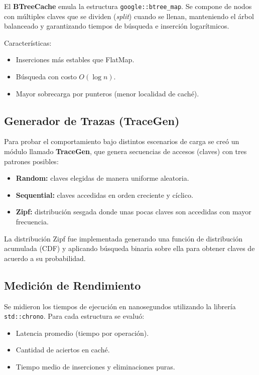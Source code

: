 \documentclass[12pt,a4paper]{article}
\begin{document}
El \textbf{BTreeCache} emula la estructura \texttt{google::btree\_map}.  
Se compone de nodos con múltiples claves que se dividen (\emph{split}) cuando se llenan,  
manteniendo el árbol balanceado y garantizando tiempos de búsqueda e inserción logarítmicos.  

Características:
\begin{itemize}
    \item Inserciones más estables que FlatMap.
    \item Búsqueda con costo \(O(\log n)\).
    \item Mayor sobrecarga por punteros (menor localidad de caché).
\end{itemize}

\subsection{Generador de Trazas (TraceGen)}

Para probar el comportamiento bajo distintos escenarios de carga se creó un módulo llamado \textbf{TraceGen},  
que genera secuencias de accesos (claves) con tres patrones posibles:

\begin{itemize}
    \item \textbf{Random:} claves elegidas de manera uniforme aleatoria.
    \item \textbf{Sequential:} claves accedidas en orden creciente y cíclico.
    \item \textbf{Zipf:} distribución sesgada donde unas pocas claves son accedidas con mayor frecuencia.
\end{itemize}

La distribución Zipf fue implementada generando una función de distribución acumulada (CDF)  
y aplicando búsqueda binaria sobre ella para obtener claves de acuerdo a su probabilidad.

\subsection{Medición de Rendimiento}

Se midieron los tiempos de ejecución en nanosegundos utilizando la librería \texttt{std::chrono}.  
Para cada estructura se evaluó:

\begin{itemize}
    \item Latencia promedio (tiempo por operación).
    \item Cantidad de aciertos en caché.
    \item Tiempo medio de inserciones y eliminaciones puras.
\end{itemize}
\end{document}
